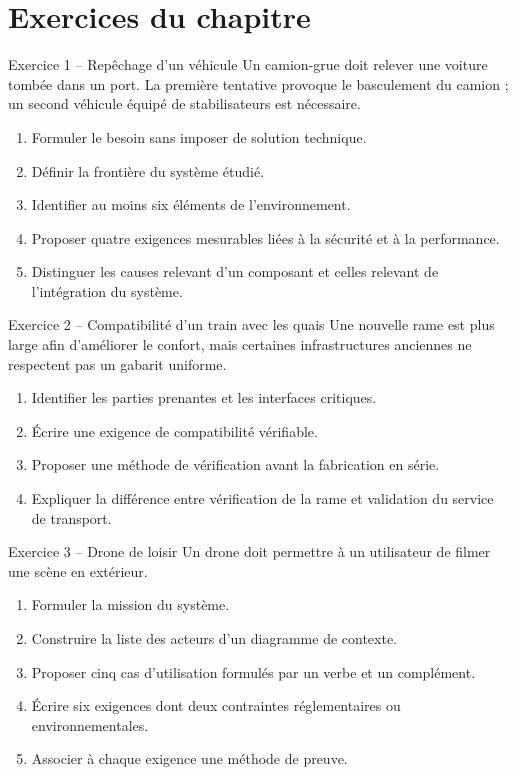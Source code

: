 
\section{Exercices du chapitre}\label{sec:is-exercices}

\begin{TLExercise}{Exercice 1 -- Repêchage d'un véhicule}
Un camion-grue doit relever une voiture tombée dans un port. La première tentative provoque le basculement du camion ; un second véhicule équipé de stabilisateurs est nécessaire.
\begin{enumerate}
  \item Formuler le besoin sans imposer de solution technique.
  \item Définir la frontière du système étudié.
  \item Identifier au moins six éléments de l'environnement.
  \item Proposer quatre exigences mesurables liées à la sécurité et à la performance.
  \item Distinguer les causes relevant d'un composant et celles relevant de l'intégration du système.
\end{enumerate}
\end{TLExercise}

\begin{TLExercise}{Exercice 2 -- Compatibilité d'un train avec les quais}
Une nouvelle rame est plus large afin d'améliorer le confort, mais certaines infrastructures anciennes ne respectent pas un gabarit uniforme.
\begin{enumerate}
  \item Identifier les parties prenantes et les interfaces critiques.
  \item Écrire une exigence de compatibilité vérifiable.
  \item Proposer une méthode de vérification avant la fabrication en série.
  \item Expliquer la différence entre vérification de la rame et validation du service de transport.
\end{enumerate}
\end{TLExercise}

\begin{TLExercise}{Exercice 3 -- Drone de loisir}
Un drone doit permettre à un utilisateur de filmer une scène en extérieur.
\begin{enumerate}
  \item Formuler la mission du système.
  \item Construire la liste des acteurs d'un diagramme de contexte.
  \item Proposer cinq cas d'utilisation formulés par un verbe et un complément.
  \item Écrire six exigences dont deux contraintes réglementaires ou environnementales.
  \item Associer à chaque exigence une méthode de preuve.
\end{enumerate}
\end{TLExercise}

